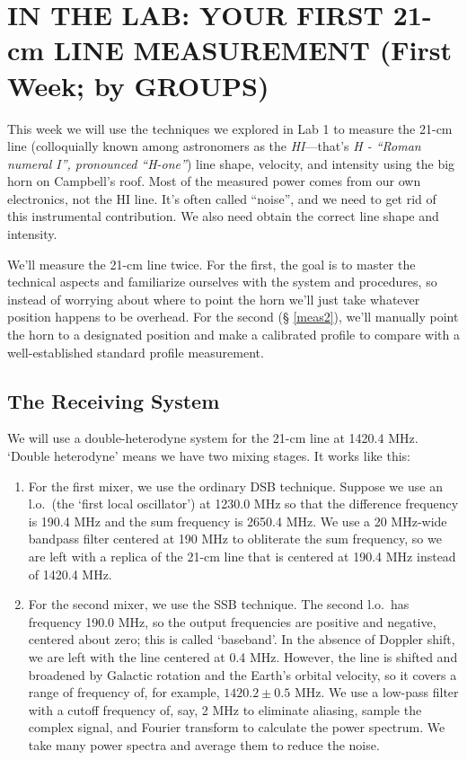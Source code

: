 \documentclass[12pt,preprint]{aastex}
\begin{document}
\section{IN THE LAB: YOUR FIRST 21-cm LINE MEASUREMENT (First Week; by GROUPS)} 
\label{radioastro}

This week we will use the techniques we explored in Lab 1 to measure the
21-cm line (colloquially known among astronomers as the {\it
  HI}---that's {\it H - ``Roman numeral I'', pronounced ``H-one''}) line
shape, velocity, and intensity using the big horn on Campbell's roof.
Most of the measured power comes from our own electronics, not the HI
line.  It's often called ``noise'', and we need to get rid of this
instrumental contribution. We also need obtain the correct line shape
and intensity.

We'll measure the 21-cm line twice. For the first, the goal is to master
the technical aspects and familiarize ourselves with the system and
procedures, so instead of worrying about where to point the horn we'll
just take whatever position happens to be overhead. For the second (\S
\ref{meas2}), we'll manually point the horn to a designated position and
make a calibrated profile to compare with a well-established standard
profile measurement.

\subsection{The Receiving System}
We will use a double-heterodyne system for the 21-cm line at 1420.4 MHz.
`Double heterodyne' means we have two mixing stages.  It works
like this: \begin{enumerate}

\item For the first mixer, we use the ordinary DSB technique. Suppose we
  use an l.o.\ (the `first local oscillator') at 1230.0 MHz so that the
  difference frequency is 190.4 MHz and the sum frequency is 2650.4 MHz.
  We use a 20 MHz-wide bandpass filter centered at 190 MHz to obliterate
  the sum frequency, so we are left with a replica of the 21-cm line
  that is centered at 190.4 MHz instead of 1420.4 MHz.

\item For the second mixer, we use the SSB technique. The second
  l.o.\ has frequency 190.0 MHz, so the output frequencies are positive
  and negative, centered about zero; this is called `baseband'. In the
  absence of Doppler shift, we are left with the line centered at 0.4
  MHz. However, the line is shifted and broadened by Galactic rotation
  and the Earth's orbital velocity, so it covers a range of frequency
  of, for example, $1420.2 \pm 0.5$ MHz. We use a low-pass filter with a
  cutoff frequency of, say, 2 MHz to
  eliminate aliasing, sample the complex signal, and Fourier transform
  to calculate the power spectrum. We take many power spectra and
  average them to reduce the noise.

\end{enumerate}
\end{document}
